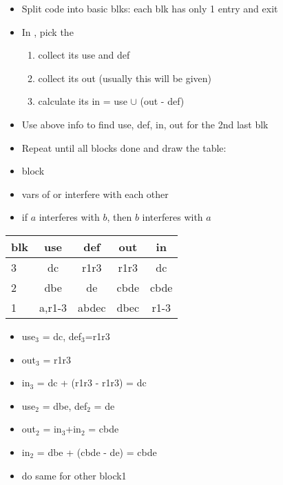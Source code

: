 \begin{itemize}
\item Split code into basic blks: each blk has only 1 entry and exit
\item In , pick the 
  \begin{enumerate}
  \item collect its use and def
  \item collect its out (usually this will be given)
  \item calculate its in = use $\cup$ (out - def)
  \end{enumerate}
\item Use above info to find use, def, in, out for the 2nd last blk
\item Repeat until all blocks done and draw the table:
\item {} block 
\item vars of  or  interfere with each other
\item if $a$ interferes with $b$, then $b$ interferes with $a$
\end{itemize}
\begin{minipage}{.54\linewidth}
\begin{tabular}{l|cc||cc}
  blk  & use & def  & out & in \\
  \hline
  3    & dc  & r1r3 & r1r3   & dc     \\
  2    & dbe & de   & cbde  & cbde    \\
  1    & a,r1-3 & abdec & dbec & r1-3 \\
  \hline
\end{tabular}
\flushleft
\begin{itemize}
\item use$_3$ = dc, def$_3$=r1r3
\item out$_3$ = r1r3
\item in$_3$ = dc + (r1r3 - r1r3) = dc
\item use$_2$ = dbe, def$_2$ = de
\item out$_2$ = in$_3$+in$_2$ = cbde
\item in$_2$ = dbe + (cbde - de) = cbde
\item do same for other block1
\end{itemize}
\end{minipage}
